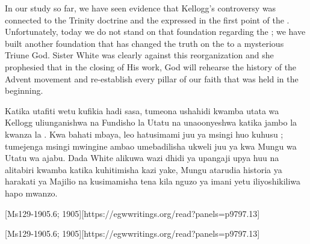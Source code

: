 



In our study so far, we have seen evidence that Kellogg’s controversy was connected to the Trinity doctrine and the  expressed in the first point of the . Unfortunately, today we do not stand on that foundation regarding the ; we have built another foundation that has changed the truth on the  to a mysterious Triune God. Sister White was clearly against this reorganization and she prophesied that in the closing of His work, God will rehearse the history of the Advent movement and re-establish every pillar of our faith that was held in the beginning.


Katika utafiti wetu kufikia hadi sasa, tumeona ushahidi kwamba utata wa Kellogg uliunganishwa na Fundisho la Utatu na  unaoonyeshwa katika jambo la kwanza la . Kwa bahati mbaya, leo hatusimami juu ya msingi huo kuhusu ; tumejenga msingi mwingine ambao umebadilisha ukweli juu ya  kwa Mungu wa Utatu wa ajabu. Dada White alikuwa wazi dhidi ya upangaji upya huu na alitabiri kwamba katika kuhitimisha kazi yake, Mungu atarudia historia ya harakati ya Majilio na kusimamisha tena kila nguzo ya imani yetu iliyoshikiliwa hapo mwanzo.


[Ms129-1905.6; 1905][https://egwwritings.org/read?panels=p9797.13]


[Ms129-1905.6; 1905][https://egwwritings.org/read?panels=p9797.13]


